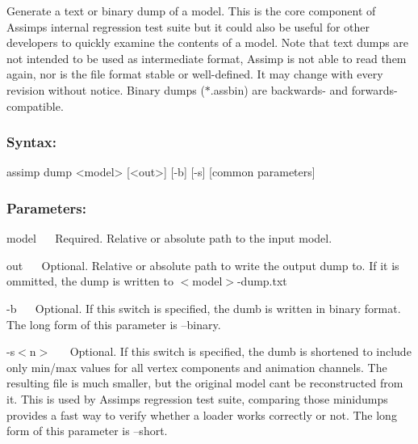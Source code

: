 Generate a text or binary dump of a model. This is the core component of Assimp\textquotesingle{}s internal regression test suite but it could also be useful for other developers to quickly examine the contents of a model. Note that text dumps are not intended to be used as intermediate format, Assimp is not able to read them again, nor is the file format stable or well-\/defined. It may change with every revision without notice. Binary dumps ($\ast$.assbin) are backwards-\/ and forwards-\/compatible.

\subsubsection*{Syntax\+:}


\begin{DoxyCode}
assimp dump <model> [<out>] [-b] [-s] [common parameters]
\end{DoxyCode}


\subsubsection*{Parameters\+:}

{\ttfamily  model~\newline
}~\newline
 Required. Relative or absolute path to the input model. 

{\ttfamily  out~\newline
}~\newline
 Optional. Relative or absolute path to write the output dump to. If it is ommitted, the dump is written to {\ttfamily $<$model$>$-\/dump.\+txt} 

{\ttfamily -\/b~\newline
 }~\newline
 Optional. If this switch is specified, the dumb is written in binary format. The long form of this parameter is {\ttfamily --binary}. 

{\ttfamily -\/s$<$n$>$~\newline
 }~\newline
 Optional. If this switch is specified, the dumb is shortened to include only min/max values for all vertex components and animation channels. The resulting file is much smaller, but the original model can\textquotesingle{}t be reconstructed from it. This is used by Assimp\textquotesingle{}s regression test suite, comparing those minidumps provides a fast way to verify whether a loader works correctly or not. The long form of this parameter is {\ttfamily --short}. 

